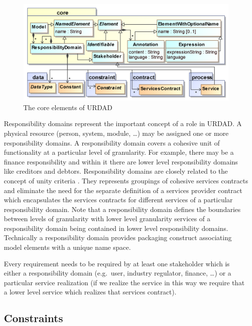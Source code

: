 \begin{figure}[Htb]
  \centering
  \includegraphics{core}
  \caption{The core elements of URDAD}
  \label{fig:metamodel}
\end{figure}

Responsibility domains represent the important concept of a role in URDAD. A physical resource (person, system, module, \dots) may be assigned one or more responsibility domains. A responsibility domain covers a cohesive unit of functionality at a particular level of granularity. For example, there may be a finance responsibility and within it there are lower level responsibility domains like creditors and debtors.  Responsibility domains are closely related to the concept of unity criteria \cite{gonzalez_unity_2009}. They represents groupings of cohesive services contracts and eliminate the need for the separate definition of a services provider contract which encapsulates the services contracts for different services of a particular responsibility domain. Note that a responsibility domain defines the boundaries between levels of granularity with lower level granularity services of a responsibility domain being contained in lower level responsibility domains. Technically a responsibility domain provides packaging construct associating model elements with a unique name space.

Every requirement needs to be required by at least one stakeholder which is either a responsibility domain (e.g.\ user, industry regulator, finance, \dots) or a particular service realization (if we realize the service in this way we require that a lower level service which realizes that services contract).



\subsection{Constraints}

